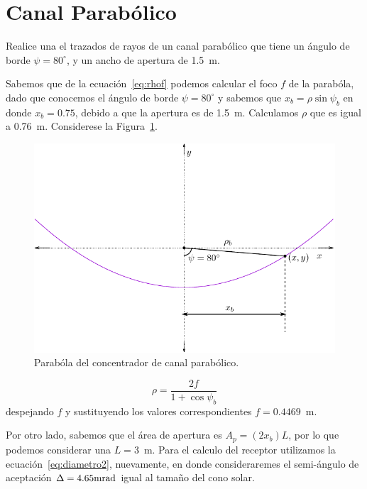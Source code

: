 \section{Canal Parabólico}
\label{sec:canal}

\begin{problem}
  Realice una el trazados de rayos de un canal parabólico que tiene un ángulo de borde $\psi = 80^\circ$, y un ancho de apertura de 1.5~m.
\end{problem}

\TheSolution Sabemos que de la ecuación~\ref{eq:rhof} podemos calcular el foco $f$ de la parabóla, dado que conocemos el ángulo de borde $\psi = 80^\circ$ y sabemos que $x_b = \rho \sin \psi_b$ en donde $x_b= 0.75$, debido a que la apertura es de 1.5~m. Calculamos $\rho$ que es igual a 0.76~m. Considerese la Figura~\ref{fig:canal}.

\begin{figure}[ht]
  \centering
  \includegraphics[width=1.0\textwidth]{figures/canalP}
  \caption{\label{fig:canal} Parabóla del concentrador de canal parabólico.}
\end{figure}

\begin{equation}
  \label{eq:rhof}
  \rho = \dfrac{2 f}{1 + \cos \psi_b}
\end{equation}
despejando $f$ y sustituyendo los valores correspondientes $f = 0.4469$~m.

Por otro lado, sabemos que el área de apertura es $A_p = (2 x_b) L$, por lo que podemos considerar una $L= 3$~m. Para el calculo del receptor utilizamos la ecuación~\ref{eq:diametro2}, nuevamente, en donde consideraremes el semi-ángulo de aceptación $\Delta = 4.65\rm mrad$ igual al tamaño del cono solar.

